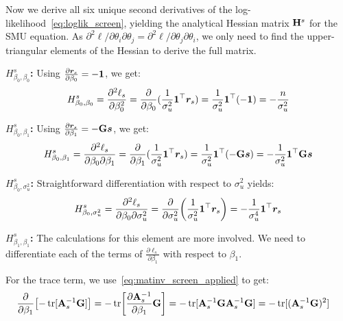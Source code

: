 Now we derive all six unique second derivatives of the log-likelihood~\eqref{eq:loglik_screen}, yielding the analytical Hessian matrix $\mathbf{H}^s$ for the SMU equation. As $\partial^2\ell/\partial\theta_i\partial\theta_j = \partial^2\ell/\partial\theta_j\partial\theta_i$, we only need to find the upper-triangular elements of the Hessian to derive the full matrix.

\textbf{$H^s_{\beta_0,\beta_0}$:} Using $\frac{\partial \bm{r}_s}{\partial \beta_0} = -\bm{1}$, we get:
\begin{equation}
    H^s_{\beta_0,\beta_0} = \frac{\partial^2 \ell_s}{\partial \beta_0^2} = \frac{\partial}{\partial\beta_0} (\frac{1}{\sigma_u^2}\bm{1}^\top\bm{r}_s) = \frac{1}{\sigma_u^2}\bm{1}^\top(-\bm{1}) = -\frac{n}{\sigma_u^2}
\end{equation}

\textbf{$H^s_{\beta_0,\beta_1}$:} Using $\frac{\partial \bm{r}_s}{\partial \beta_1} = -\mathbf{G}\bm{s}$, we get:
\begin{equation}
    H^s_{\beta_0,\beta_1} = \frac{\partial^2 \ell_s}{\partial \beta_0 \partial \beta_1} = \frac{\partial}{\partial\beta_1} (\frac{1}{\sigma_u^2}\bm{1}^\top\bm{r}_s) = \frac{1}{\sigma_u^2}\bm{1}^\top(-\mathbf{G}\bm{s}) = -\frac{1}{\sigma_u^2}\bm{1}^\top\mathbf{G}\bm{s}
\end{equation}

\textbf{$H^s_{\beta_0,\sigma_u^2}$:} Straightforward differentiation with respect to $\sigma_u^2$ yields:
\begin{equation}
    H^s_{\beta_0,\sigma_u^2} = \frac{\partial^2 \ell_s}{\partial \beta_0 \partial \sigma_u^2} = \frac{\partial}{\partial\sigma_u^2} \!\left(\frac{1}{\sigma_u^2}\bm{1}^\top\bm{r}_s\right) = -\frac{1}{\sigma_u^4}\bm{1}^\top\bm{r}_s
\end{equation}

\textbf{$H^s_{\beta_1,\beta_1}$:} The calculations for this element are more involved. We need to differentiate each of the terms of $\frac{\partial \ell_s}{\partial \beta_1}$ with respect to $\beta_1$.

For the trace term, we use~\eqref{eq:matinv_screen_applied} to get:
\begin{align}
    \frac{\partial}{\partial \beta_1}\bigl[-\operatorname{tr}[\mathbf{A}_s^{-1}\mathbf{G}]\bigr]
    &= -\operatorname{tr}\!\left[\frac{\partial \mathbf{A}_s^{-1}}{\partial \beta_1}\mathbf{G}\right]
    = -\operatorname{tr}[\mathbf{A}_s^{-1}\mathbf{G}\mathbf{A}_s^{-1}\mathbf{G}]
    = -\operatorname{tr}[(\mathbf{A}_s^{-1}\mathbf{G})^2]
\end{align}

